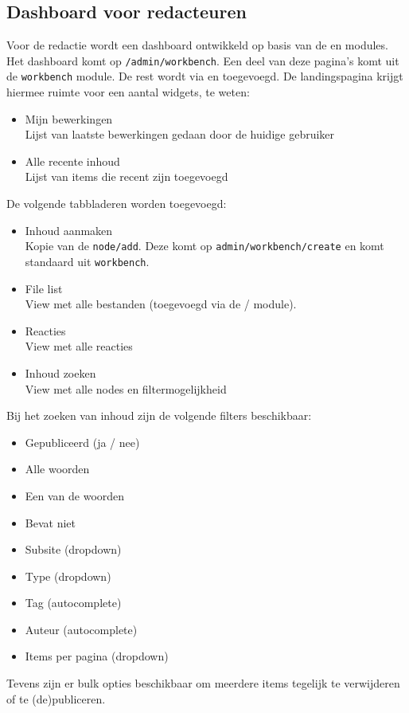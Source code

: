 \subsection{Dashboard voor redacteuren}\label{workbenchdashboard}

Voor de redactie wordt een dashboard ontwikkeld op basis van de  en  modules. Het dashboard komt op \texttt{/admin/workbench}. Een deel van deze pagina's komt uit de \texttt{workbench} module. De rest wordt via  en  toegevoegd. De landingspagina krijgt hiermee ruimte voor een aantal widgets, te weten:
\begin{itemize}
\item Mijn bewerkingen \\ Lijst van laatste bewerkingen gedaan door de huidige gebruiker
\item Alle recente inhoud \\ Lijst van items die recent zijn toegevoegd
\end{itemize}
De volgende tabbladeren worden toegevoegd:
\begin{itemize}
\item Inhoud aanmaken \\ Kopie van de \texttt{node/add}. Deze komt op \texttt{admin/workbench/create} en komt standaard uit \texttt{workbench}.
\item File list \\ View met alle bestanden (toegevoegd via de  /  module).
\item Reacties \\ View met alle reacties
\item Inhoud zoeken \\ View met alle nodes en filtermogelijkheid
\end{itemize}
Bij het zoeken van inhoud zijn de volgende filters beschikbaar:
\begin{itemize}
\item Gepubliceerd (ja / nee)
\item Alle woorden
\item Een van de woorden
\item Bevat niet
\item Subsite (dropdown)
\item Type (dropdown)
\item Tag (autocomplete)
\item Auteur (autocomplete)
\item Items per pagina (dropdown)
\end{itemize}
Tevens zijn er bulk opties beschikbaar om meerdere items tegelijk te verwijderen of te (de)publiceren.
